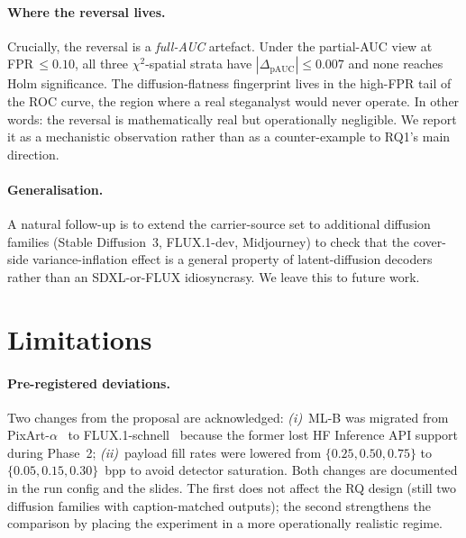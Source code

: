 \documentclass[10pt,twocolumn,a4paper]{article}
\begin{document}
\paragraph{Where the reversal lives.} Crucially, the reversal is a \emph{full-AUC} artefact. Under the partial-AUC view at FPR\,$\leq\!0.10$, all three $\chi^2$-spatial strata have $|\Delta_\text{pAUC}|\!\leq\!0.007$ and none reaches Holm significance. The diffusion-flatness fingerprint lives in the high-FPR tail of the ROC curve, the region where a real steganalyst would never operate. In other words: the reversal is mathematically real but operationally negligible. We report it as a mechanistic observation rather than as a counter-example to RQ1's main direction.

\paragraph{Generalisation.} A natural follow-up is to extend the carrier-source set to additional diffusion families (Stable Diffusion~3, FLUX.1-dev, Midjourney) to check that the cover-side variance-inflation effect is a general property of latent-diffusion decoders rather than an SDXL-or-FLUX idiosyncrasy. We leave this to future work.

\section{Limitations}
\label{sec:limitations}

\paragraph{Pre-registered deviations.} Two changes from the proposal are acknowledged: \textit{(i)}~ML-B was migrated from PixArt-$\alpha$~\cite{pixart2023} to FLUX.1-schnell~\cite{flux2024} because the former lost HF Inference API support during Phase~2; \textit{(ii)}~payload fill rates were lowered from $\{0.25,0.50,0.75\}$ to $\{0.05,0.15,0.30\}$~bpp to avoid detector saturation. Both changes are documented in the run config and the slides. The first does not affect the RQ design (still two diffusion families with caption-matched outputs); the second strengthens the comparison by placing the experiment in a more operationally realistic regime.
\end{document}
